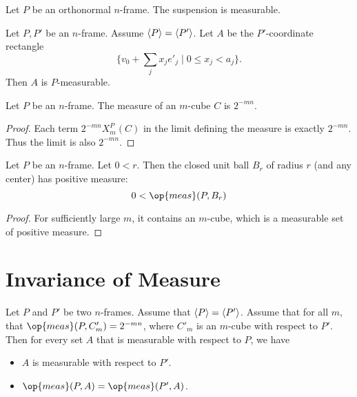 \begin{lemma}  Let $P$ be an orthonormal $n$-frame.  The suspension
is measurable.
\end{lemma}

\begin{lemma}
Let $P,P'$ be an $n$-frame.  Assume ${\langle P\rangle} = {\langle P'\rangle}$. Let
$A$ be the $P'$-coordinate rectangle
    $$\{v_0 + \sum_j x_j e'_j \mid 0\le x_j < a_j\}.$$
Then $A$ is $P$-measurable.
\end{lemma}

\begin{lemma} Let $P$ be an $n$-frame.  The measure of an $m$-cube $C$ is
$2^{-m n}$.
\end{lemma}

\begin{proof} Each term $2^{-m n}X^P_m(C)$
in the limit defining the measure is exactly $2^{-m n}$.  Thus the
limit is also $2^{-m n}$.
\end{proof}

\begin{lemma}
Let $P$ be an $n$-frame.  Let $0 < r$.  Then the closed unit ball
$B_r$ of radius $r$ (and any center) has positive measure:
    $$0 < \op{meas}(P,B_r)$$
\end{lemma}

\begin{proof} For sufficiently large $m$, it contains an $m$-cube,
which is a measurable set of positive measure.
\end{proof}

\section{Invariance of Measure}

\begin{lemma}  Let $P$ and $P'$ be two $n$-frames.  Assume that
${\langle P\rangle} = {\langle P'\rangle}$.    Assume that for all $m$, that
$\op{meas}(P,C'_m) = 2^{-m n}$, where $C'_m$ is an $m$-cube with
respect to $P'$.  Then for every set $A$ that is measurable with
respect to $P$, we have
\begin{itemize}
        \item $A$ is measurable with respect to $P'$.
        \item $\op{meas}(P,A) = \op{meas}(P',A)$.
    \end{itemize}
\end{lemma}

